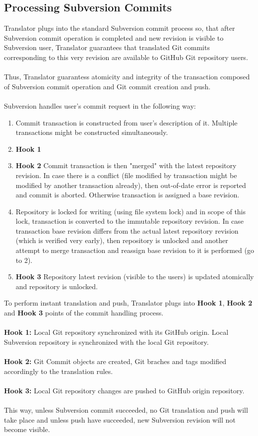 \subsection{Processing Subversion Commits}

Translator plugs into the standard Subversion commit process so, that after Subversion commit operation
is completed and new revision is visible to Subversion user, Translator guarantees that translated Git commits
corresponding to this very revision are available to GitHub Git repository users.
\\\\
Thus, Translator guarantess atomicity and integrity of the transaction composed of Subversion commit operation
and Git commit creation and push.
\\\\
Subversion handles user's commit request in the following way:

\begin{enumerate}
\item Commit transaction is constructed from user's description of it. Multiple transactions might be constructed simultaneously.
\item \textbf{Hook 1}
\item \textbf{Hook 2} Commit transaction is then "merged" with the latest repository revision. In case there is a conflict (file modified by transaction might be modified by another transaction already), then out-of-date error is reported and commit is aborted. Otherwise transaction is assigned a base revision.
\item Repository is locked for writing (using file system lock) and in scope of this lock, transaction is converted to the immutable repository revision. In case transaction base revision differs from the actual latest repository revision (which is verified very early), then repository is unlocked and another attempt to merge transaction and reassign base revision to it is performed (go to 2).
\item \textbf{Hook 3} Repository latest revision (visible to the users) is updated atomically and repository is unlocked.
\end{enumerate}
To perform instant translation and push, Translator plugs into \textbf{Hook 1}, \textbf{Hook 2} and \textbf{Hook 3} points of the commit handling process.
\\\\
\textbf{Hook 1:} Local Git repository synchronized with its GitHub origin. Local Subversion repository is synchronized with the local Git repository.
\\\\
\textbf{Hook 2:} Git Commit objects are created, Git braches and tags modified accordingly to the translation rules.
\\\\
\textbf{Hook 3:} Local Git repository changes are pushed to GitHub origin repository.
\\\\
This way, unless Subversion commit succeeded, no Git translation and push will take place and unless push have succeeded, new Subversion revision will not become visible.
